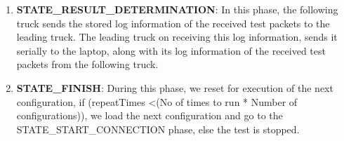\begin{enumerate}
    \item \textbf{STATE\_RESULT\_DETERMINATION}: In this phase, the following truck sends the stored log information of the received test packets to the leading truck. The leading truck on receiving this log information, sends it serially to the laptop, along with its log information of the received test packets from the following truck.
    
    \item \textbf{STATE\_FINISH}: During this phase, we reset for execution of the next configuration, if (repeatTimes \textless (No of times to run * Number of configurations)), we load the next configuration and go to the STATE\_START\_CONNECTION phase, else the test is stopped.
    
\end{enumerate}



